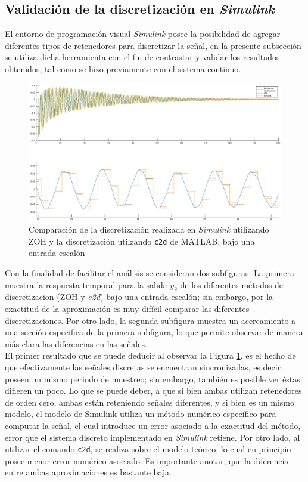 \documentclass[journal]{IEEEtran}
\begin{document}
\subsection{Validación de la discretización en \textit{Simulink}}
El entorno de programación visual \textit{Simulink} posee la posibilidad de agregar diferentes tipos de retenedores para discretizar la señal, en la presente subsección se utiliza dicha herramienta con el fin de contrastar y validar los resultados obtenidos, tal como se hizo previamente con el sistema continuo.\\

\begin{figure}[t!]
\caption{Comparación de la discretización realizada en \textit{Simulink} utilizando ZOH y la discretización utilzando \texttt{c2d} de MATLAB, bajo una entrada escalón\label{fig:dis5}}
\includegraphics[scale=0.19]{5.eps}
\end{figure}

Con la  finalidad de facilitar el análisis se consideran dos subfiguras. La primera muestra la respuesta temporal para la salida $y_2$ de los diferentes métodos de discretizacion (ZOH y \textit{c2d}) bajo una entrada escalón; sin embargo, por la exactitud de la aproximación es muy difícil comparar las diferentes discretizaciones. Por otro lado, la segunda subfigura muestra un acercamiento a una sección especifica de la primera subfigura, lo que permite observar de manera más clara las diferencias en las señales.\\ 

El primer resultado que se puede deducir al observar la Figura \ref{fig:dis5}, es el hecho de que efectivamente las señales discretas se encuentran sincronizadas, es decir, poseen un mismo periodo de muestreo; sin embargo, también es posible ver éstas difieren un poco. Lo que se puede deber, a que si bien ambas utilizan retenedores de orden cero, ambas están reteniendo señales diferentes, y si bien es un mismo modelo, el modelo de Simulink utiliza un método numérico específico para computar la señal, el cual introduce un error asociado a la exactitud del método, error que el sistema discreto implementado en \textit{Simulink} retiene. Por otro lado, al utilizar el comando \texttt{c2d}, se realiza sobre el modelo teórico, lo cual en principio posee menor error numérico asociado. Es importante anotar, que la diferencia entre ambas aproximaciones es bastante baja.
\end{document}
